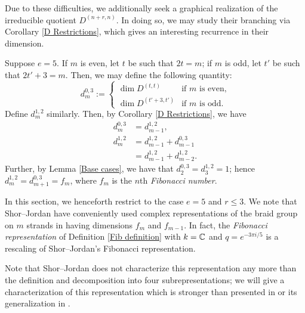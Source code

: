 \documentclass{amsart}
\begin{document}
Due to these difficulties, we additionally seek a graphical realization of the irreducible quotient $D^{(n+r,n)}$.
In doing so, we may study their branching via Corollary \ref{D Restrictions}, which gives an interesting recurrence in their dimension. 
\begin{example}
Suppose $e = 5$. 
If $m$ is even, let $t$ be such that $2t = m$;
if $m$ is odd, let $t'$ be such that $2t' + 3 = m$.
Then, we may define the following quantity:
\[
  d_{m}^{0,3} := \begin{cases}
    \dim D^{(t,t)} & \text{if } m \text{ is even,}\\
    \dim D^{(t'+3,t')} & \text{if } m \text{ is odd.}
  \end{cases}
\]
Define $d_m^{1,2}$ similarly.
Then, by Corollary \ref{D Restrictions}, we have
\begin{align*}
    d_m^{0,3} &= d_{m-1}^{1,2},\\
    d_m^{1,2} &= d_{m-1}^{1,2} + d_{m-1}^{0,3}\\
    &= d_{m-1}^{1,2} + d_{m-2}^{1,2}.
\end{align*}
Further, by Lemma \ref{Base cases}, we have that $d_2^{0,3} = d_3^{1,2} = 1$;
hence $d_m^{1,2} = d_{m+1}^{0,3} = f_m$, where $f_m$ is the $n$th \emph{Fibonacci number}.
\end{example}

In this section, we henceforth restrict to the case $e = 5$ and $r \leq 3$.
We note that Shor--Jordan \cite{Shor} have conveniently used complex representations of the braid group on $m$ strands in \cite{Shor} having dimensions $f_m$ and $f_{m-1}$.
In fact, the \emph{Fibonacci representation} of Definition \ref{Fib definition} with $k = \mathbb{C}$ and $q = e^{-3\pi i /5}$ is a rescaling of Shor--Jordan's Fibonacci representation.

Note that Shor--Jordan does not characterize this representation any more than the definition and decomposition into four subrepresentations;
we will give a characterization of this representation which is stronger than presented in \cite{Shor} or its generalization in \cite{Aharonov}.
\end{document}

